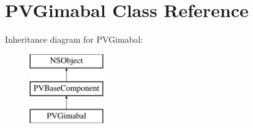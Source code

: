 \hypertarget{interface_p_v_gimabal}{}\section{P\+V\+Gimabal Class Reference}
\label{interface_p_v_gimabal}
Inheritance diagram for P\+V\+Gimabal\+:\begin{figure}[H]
\begin{center}
\leavevmode
\includegraphics[height=3.000000cm]{interface_p_v_gimabal}
\end{center}
\end{figure}
